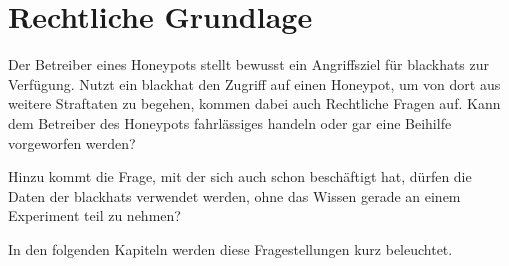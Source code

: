 \section{Rechtliche Grundlage}

Der Betreiber eines Honeypots stellt bewusst ein Angriffsziel für blackhats zur Verfügung. Nutzt ein blackhat den Zugriff auf einen Honeypot, um von dort aus weitere Straftaten zu begehen, kommen dabei auch Rechtliche Fragen auf. Kann dem  Betreiber des Honeypots fahrlässiges handeln oder gar eine Beihilfe vorgeworfen werden?

Hinzu kommt die Frage, mit der sich auch schon \cite{dornseif.2012a} beschäftigt hat, dürfen die Daten der blackhats verwendet werden, ohne das Wissen gerade an einem Experiment teil zu nehmen? 

In den folgenden Kapiteln werden diese Fragestellungen kurz beleuchtet. 


